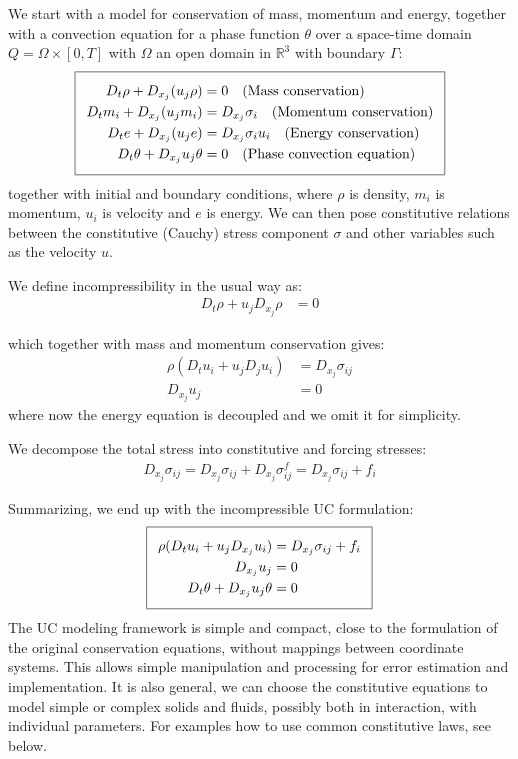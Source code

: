 We start with a model for conservation of mass, momentum and energy,
together with a convection equation for a phase function $\theta$ over
a space-time domain $Q = \Omega \times [0, T]$ with $\Omega$ an open
domain in $\mathbb{R}^3$ with boundary $\Gamma$:
\begin{equation}
  \addtolength{\fboxsep}{5pt}
  \boxed{
    \begin{split}\label{eq:TotalModel}
      D_t \rho + D_{x_j} (u_j \rho) &= 0
      \quad \text{(Mass conservation)}\\
      D_t m_i + D_{x_j} (u_j m_i) &= D_{x_j} \sigma_i
      \quad \text{(Momentum conservation)}\\
      D_t e + D_{x_j} (u_j e) &= D_{x_j} \sigma_i u_i
      \quad \text{(Energy conservation)}\\
      D_t \theta + D_{x_j} u_j \theta &= 0
      \quad \text{(Phase convection equation)}
    \end{split}
  }
\end{equation}
together with initial and boundary conditions, where $\rho$ is
density, $m_i$ is momentum, $u_i$ is velocity and $e$ is energy. We
can then pose constitutive relations between the constitutive (Cauchy)
stress component $\sigma$ and other variables such as the velocity
$u$.

We define incompressibility in the usual way as:
\begin{align}
D_t \rho + u_j D_{x_j} \rho &= 0
\end{align}

which together with mass and momentum conservation gives:
\begin{align}
\rho(D_t u_i + u_j D_j u_i) &= D_{x_j} \sigma_{ij}\\
D_{x_j} u_j &= 0
\end{align}
where now the energy equation is decoupled and we omit it for simplicity.

We decompose the total stress into constitutive and forcing stresses:
\begin{align}
D_{x_j} \sigma_{ij} = D_{x_j} \sigma_{ij} + D_{x_j} \sigma^f_{ij} =
D_{x_j} \sigma_{ij} + f_i
\end{align}

Summarizing, we end up with the incompressible UC formulation:
\begin{equation}
  \addtolength{\fboxsep}{5pt}
  \boxed{
    \begin{split}\label{eq:TotalUC}
      \rho(D_t u_i + u_j D_{x_j} u_i) &= D_{x_j} \sigma_{ij} + f_i\\
      D_{x_j} u_j &= 0\\
      D_t \theta + D_{x_j} u_j \theta &= 0
    \end{split}
  }
\end{equation}
The UC modeling framework is simple and compact, close to the
formulation of the original conservation equations, without mappings
between coordinate systems. This allows simple manipulation and
processing for error estimation and implementation. It is also
general, we can choose the constitutive equations to model simple or
complex solids and fluids, possibly both in interaction, with
individual parameters. For examples how to use common constitutive
laws, see below.

